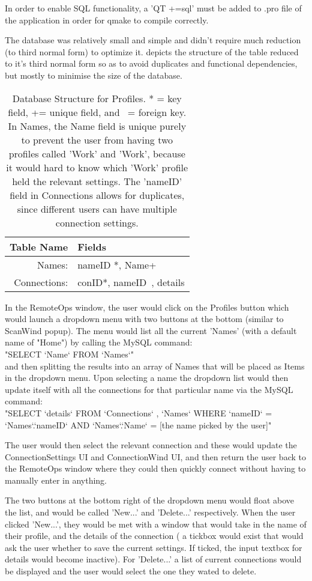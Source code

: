 \documentclass[11pt]{article} %
\newcommand{\tab}{\hspace*{2em}}
\begin{document}
In order to enable SQL functionality, a 'QT +=sql' must be added to .pro file of the application in order for qmake to compile correctly.

The database was relatively small and simple and didn't require much reduction (to third normal form) to optimize it.  depicts the structure of the table reduced to it's third normal form so as to avoid duplicates and functional dependencies, but mostly to minimise the size of the database.
\begin{table}[H]
\centering
\begin{tabular}{| r | l | }
\hline
Table Name	&Fields\\\hline
Names:		&nameID *, Name+\\
Connections: 	&conID*, nameID~, details\\\hline
\end{tabular}
\caption{Database Structure for Profiles. * = key field, += unique field, and ~= foreign key. In Names, the Name field is unique purely to prevent the user from having two profiles called 'Work' and 'Work', because it would hard to know which 'Work' profile held the relevant settings. The 'nameID' field in Connections allows for duplicates, since different users can have multiple connection settings.}
\label{tab:profiledb}
\end{table}

In the RemoteOps window, the user would click on the Profiles button which would launch a dropdown menu with two buttons at the bottom (similar to ScanWind popup). The menu would list all the current 'Names' (with a default name of "Home") by calling the MySQL command:\\
\tab"SELECT `Name` FROM `Names`"\\
and then splitting the results into an array of Names that will be placed as Items in the dropdown menu. Upon selecting a name the dropdown list would then update itself with all the connections for that particular name via the MySQL command:\\
\tab"SELECT `details` FROM `Connections` , `Names` WHERE `nameID` = `Names`.`nameID` AND `Names`.`Name` =  [the name picked by the user]"

The user would then select the relevant connection and these would update the ConnectionSettings UI and ConnectionWind UI, and then return the user back to the RemoteOps window where they could then quickly connect without having to manually enter in anything.

The two buttons at the bottom right of the dropdown menu would float above the list, and would be called 'New...' and 'Delete...' respectively. When the user clicked 'New...', they would be met with a window that would take in the name of their profile, and the details of the connection ( a tickbox would exist that would ask the user whether to save the current settings. If ticked, the input textbox for details would become inactive).  For 'Delete...' a list of current connections would be displayed and the user would select the one they wated to delete.
\end{document}
